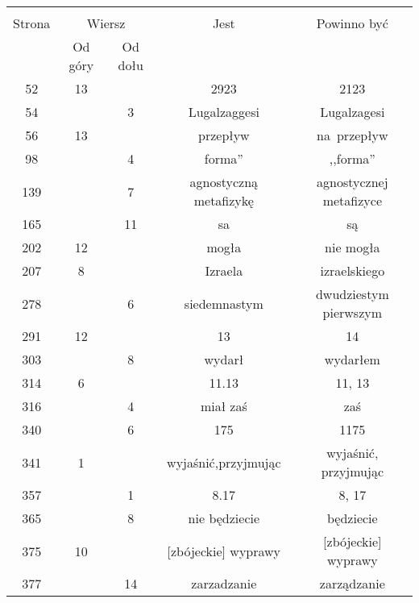 \documentclass[a4paper,11pt]{article}
\begin{document}
\begin{center}
  \begin{tabular}{|c|c|c|c|c|}
    \hline
    & \multicolumn{2}{c|}{} & & \\
    Strona & \multicolumn{2}{c|}{Wiersz}& Jest & Powinno być \\ \cline{2-3}
    & Od góry & Od dołu &  &  \\ \hline
    52 & 13 & & 2923 & 2123 \\
    54 & & 3 & Lugalzaggesi & Lugalzagesi \\
    56 & 13 & & przepływ & na~przepływ \\
    98 & & 4 & forma'' & ,,forma'' \\
    139 & & 7 & agnostyczną metafizykę & agnostycznej metafizyce \\
    165 & & 11 & sa & są \\
    202 & 12 & & mogła & nie mogła \\
    207 & 8 & & Izraela & izraelskiego \\
    278 & & 6 & siedemnastym & dwudziestym pierwszym \\
    291 & 12 & & 13 & 14 \\
    303 & & 8 & wydarł & wydarłem \\
    314 & 6 & & 11.13 & 11, 13 \\
    316 & & 4 & miał zaś & zaś \\
    340 & & 6 & 175 & 1175 \\
    341 & 1 & & wyjaśnić,przyjmując & wyjaśnić, przyjmując \\
    357 & & 1 & 8.17 & 8, 17 \\
    365 & & 8 & nie będziecie & będziecie \\
    375 & 10 & & [zbójeckie]{ } wyprawy & [zbójeckie] wyprawy \\
    377 & & 14 & zarzadzanie & zarządzanie \\
    \hline
  \end{tabular}
\end{center}

\vspace{\spaceTwo}





 {}


\end{document}
